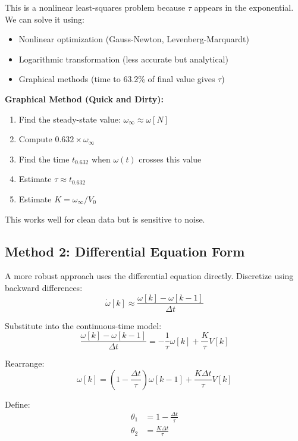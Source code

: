 This is a nonlinear least-squares problem because $\tau$ appears in the exponential. We can solve it using:
\begin{itemize}
    \item Nonlinear optimization (Gauss-Newton, Levenberg-Marquardt)
    \item Logarithmic transformation (less accurate but analytical)
    \item Graphical methods (time to 63.2\% of final value gives $\tau$)
\end{itemize}

\textbf{Graphical Method (Quick and Dirty):}
\begin{enumerate}
    \item Find the steady-state value: $\omega_{\infty} \approx \omega[N]$
    \item Compute $0.632 \times \omega_{\infty}$
    \item Find the time $t_{0.632}$ when $\omega(t)$ crosses this value
    \item Estimate $\tau \approx t_{0.632}$
    \item Estimate $K = \omega_{\infty}/V_0$
\end{enumerate}

This works well for clean data but is sensitive to noise.

\subsection{Method 2: Differential Equation Form}

A more robust approach uses the differential equation directly. Discretize using backward differences:
\begin{equation}
\dot{\omega}[k] \approx \frac{\omega[k] - \omega[k-1]}{\Delta t}
\end{equation}

Substitute into the continuous-time model:
\begin{equation}
\frac{\omega[k] - \omega[k-1]}{\Delta t} = -\frac{1}{\tau}\omega[k] + \frac{K}{\tau}V[k]
\end{equation}

Rearrange:
\begin{equation}
\omega[k] = \left(1 - \frac{\Delta t}{\tau}\right)\omega[k-1] + \frac{K\Delta t}{\tau}V[k]
\end{equation}

Define:
\begin{align}
\theta_1 &= 1 - \frac{\Delta t}{\tau} \\
\theta_2 &= \frac{K\Delta t}{\tau}
\end{align}

